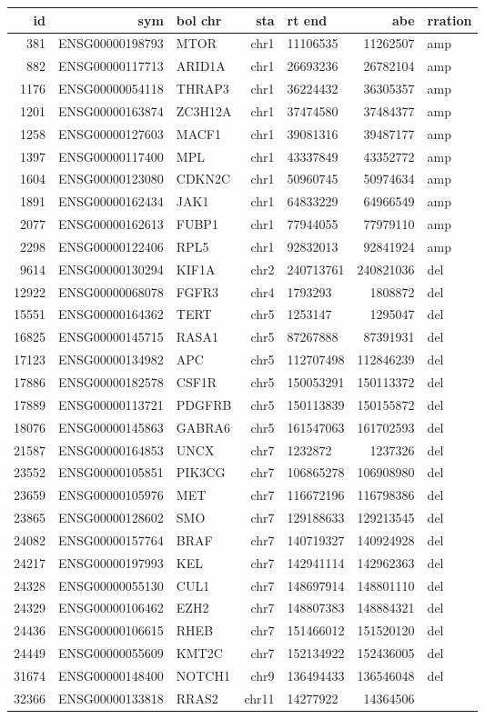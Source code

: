 \documentclass[]{article}
\begin{document}
\begin{longtable}[]{@{}rrlrlrl@{}}
\toprule
id & sym & bol chr & sta & rt end & abe & rration\tabularnewline
\midrule
\endhead
381 & ENSG00000198793 & MTOR & chr1 & 11106535 & 11262507 &
amp\tabularnewline
882 & ENSG00000117713 & ARID1A & chr1 & 26693236 & 26782104 &
amp\tabularnewline
1176 & ENSG00000054118 & THRAP3 & chr1 & 36224432 & 36305357 &
amp\tabularnewline
1201 & ENSG00000163874 & ZC3H12A & chr1 & 37474580 & 37484377 &
amp\tabularnewline
1258 & ENSG00000127603 & MACF1 & chr1 & 39081316 & 39487177 &
amp\tabularnewline
1397 & ENSG00000117400 & MPL & chr1 & 43337849 & 43352772 &
amp\tabularnewline
1604 & ENSG00000123080 & CDKN2C & chr1 & 50960745 & 50974634 &
amp\tabularnewline
1891 & ENSG00000162434 & JAK1 & chr1 & 64833229 & 64966549 &
amp\tabularnewline
2077 & ENSG00000162613 & FUBP1 & chr1 & 77944055 & 77979110 &
amp\tabularnewline
2298 & ENSG00000122406 & RPL5 & chr1 & 92832013 & 92841924 &
amp\tabularnewline
9614 & ENSG00000130294 & KIF1A & chr2 & 240713761 & 240821036 &
del\tabularnewline
12922 & ENSG00000068078 & FGFR3 & chr4 & 1793293 & 1808872 &
del\tabularnewline
15551 & ENSG00000164362 & TERT & chr5 & 1253147 & 1295047 &
del\tabularnewline
16825 & ENSG00000145715 & RASA1 & chr5 & 87267888 & 87391931 &
del\tabularnewline
17123 & ENSG00000134982 & APC & chr5 & 112707498 & 112846239 &
del\tabularnewline
17886 & ENSG00000182578 & CSF1R & chr5 & 150053291 & 150113372 &
del\tabularnewline
17889 & ENSG00000113721 & PDGFRB & chr5 & 150113839 & 150155872 &
del\tabularnewline
18076 & ENSG00000145863 & GABRA6 & chr5 & 161547063 & 161702593 &
del\tabularnewline
21587 & ENSG00000164853 & UNCX & chr7 & 1232872 & 1237326 &
del\tabularnewline
23552 & ENSG00000105851 & PIK3CG & chr7 & 106865278 & 106908980 &
del\tabularnewline
23659 & ENSG00000105976 & MET & chr7 & 116672196 & 116798386 &
del\tabularnewline
23865 & ENSG00000128602 & SMO & chr7 & 129188633 & 129213545 &
del\tabularnewline
24082 & ENSG00000157764 & BRAF & chr7 & 140719327 & 140924928 &
del\tabularnewline
24217 & ENSG00000197993 & KEL & chr7 & 142941114 & 142962363 &
del\tabularnewline
24328 & ENSG00000055130 & CUL1 & chr7 & 148697914 & 148801110 &
del\tabularnewline
24329 & ENSG00000106462 & EZH2 & chr7 & 148807383 & 148884321 &
del\tabularnewline
24436 & ENSG00000106615 & RHEB & chr7 & 151466012 & 151520120 &
del\tabularnewline
24449 & ENSG00000055609 & KMT2C & chr7 & 152134922 & 152436005 &
del\tabularnewline
31674 & ENSG00000148400 & NOTCH1 & chr9 & 136494433 & 136546048 &
del\tabularnewline
32366 & ENSG00000133818 & RRAS2 & chr11 & 14277922 & 14364506 &

\end{longtable}
\end{document}
